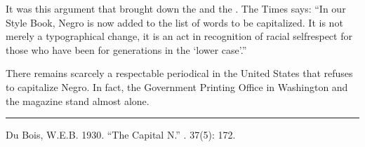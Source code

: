 \documentclass[letterpaper,10pt,english]{jupyterBook}
\begin{document}
\sphinxAtStartPar
It was this argument that brought down the  and the . The Times says: “In our Style Book, Negro is now added to the list of words to be capitalized. It is not merely a typographical change, it is an act in recognition of racial self\sphinxhyphen{}respect for those who have been for generations in the `lower case’.”

\sphinxAtStartPar
There remains scarcely a respectable periodical in the United States that refuses to capitalize Negro. In fact, the Government Printing Office in Washington and the  magazine stand almost alone.


\bigskip\hrule\bigskip


\sphinxAtStartPar
{} Du Bois, W.E.B. 1930. “The Capital N.” . 37(5): 172.
\end{document}
